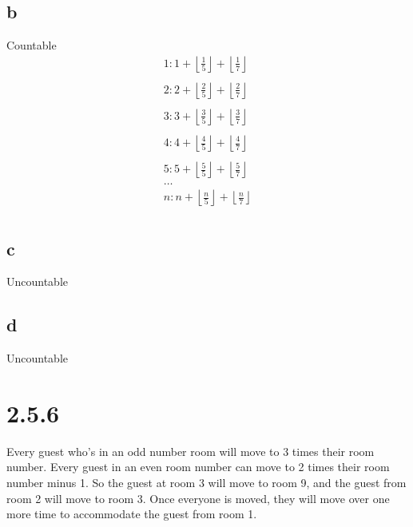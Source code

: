 \documentclass{article}
\begin{document}
{			\subsection* {b}
				Countable
				\[
					\begin{matrix}
						1: 1 + \left \lfloor{\frac{1}{5}}\right \rfloor + \left \lfloor{\frac{1}{7}}\right \rfloor \\
						\\
						2: 2 + \left \lfloor{\frac{2}{5}}\right \rfloor + \left \lfloor{\frac{2}{7}}\right \rfloor \\
						\\
						3: 3 + \left \lfloor{\frac{3}{5}}\right \rfloor + \left \lfloor{\frac{3}{7}}\right \rfloor \\
						\\
						4: 4 + \left \lfloor{\frac{4}{5}}\right \rfloor + \left \lfloor{\frac{4}{7}}\right \rfloor \\
						\\
						5: 5 + \left \lfloor{\frac{5}{5}}\right \rfloor + \left \lfloor{\frac{5}{7}}\right \rfloor \\
						\dots \\
						n: n + \left \lfloor{\frac{n}{5}}\right \rfloor + \left \lfloor{\frac{n}{7}}\right \rfloor \\
					\end{matrix}
				\]
			\subsection* {c}
				Uncountable
			\subsection* {d}
				Uncountable
				
		\section* {\Large{\textbf{2.5.6}}}
			Every guest who's in an odd number room will move to 3 times their room number. Every guest in an even room number can move to 2 times their room number minus 1. So the guest at room 3 will move to room 9, and the guest from room 2 will move to room 3. Once everyone is moved, they will move over one more time to accommodate the guest from room 1.
	}
\end{document}
